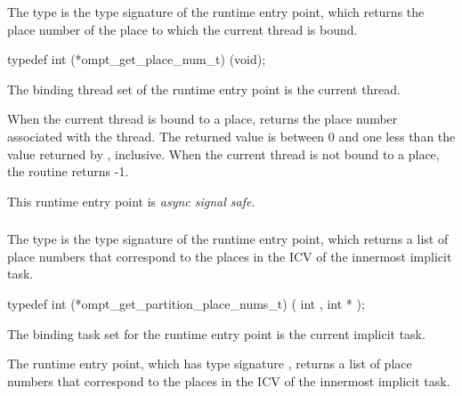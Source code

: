 \summary
The  type is the type signature of the 
 runtime entry point, which returns the
place number of the place to which the current thread is bound.

\format
\begin{ccppspecific}
\begin{omptInquiry}
typedef int (*ompt_get_place_num_t) (void);
\end{omptInquiry}
\end{ccppspecific}

\binding
The binding thread set of the  runtime entry point
is the current thread.

\descr
When the current thread is bound to a place, 
returns the place number associated with the thread. The returned value 
is between 0 and one less than the value returned by , 
inclusive. When the current thread is not bound to a place, the routine returns -1.

This runtime entry point is \emph{async signal safe}.



\subsubsection{}
\label{sec:ompt_get_partition_place_nums_t}
\label{sec:ompt_get_partition_place_nums}

\summary
The  type is the type signature 
of the  runtime entry point, which 
returns a list of place numbers that correspond to the places in the 
 ICV of the innermost implicit task.

\format
\begin{ccppspecific}
\begin{omptInquiry}
typedef int (*ompt_get_partition_place_nums_t) (
  int ,
  int *
);
\end{omptInquiry}
\end{ccppspecific}

\binding
The binding task set for the  runtime 
entry point is the current implicit task.

\descr
The  runtime entry point, which has
type signature , returns a list of 
place numbers that correspond to the places in the 
ICV of the innermost implicit task.

